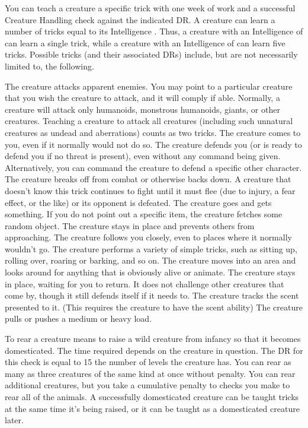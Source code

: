          You can teach a creature a specific trick with one week of work and a successful Creature Handling check against the indicated DR\@. A creature can learn a number of tricks equal to its Intelligence . Thus, a creature with an Intelligence of  can learn a single trick, while a creature with an Intelligence of  can learn five tricks. Possible tricks (and their associated DRs) include, but are not necessarily limited to, the following.

         The creature attacks apparent enemies. You may point to a particular creature that you wish the creature to attack, and it will comply if able. Normally, a creature will attack only humanoids, monstrous humanoids, giants, or other creatures. Teaching a creature to attack all creatures (including such unnatural creatures as undead and aberrations) counts as two tricks.
         The creature comes to you, even if it normally would not do so.
         The creature defends you (or is ready to defend you if no threat is present), even without any command being given. Alternatively, you can command the creature to defend a specific other character.
         The creature breaks off from combat or otherwise backs down. A creature that doesn't know this trick continues to fight until it must flee (due to injury, a fear effect, or the like) or its opponent is defeated.
         The creature goes and gets something. If you do not point out a specific item, the creature fetches some random object.
         The creature stays in place and prevents others from approaching.
         The creature follows you closely, even to places where it normally wouldn't go.
         The creature performs a variety of simple tricks, such as sitting up, rolling over, roaring or barking, and so on.
         The creature moves into an area and looks around for anything that is obviously alive or animate.
         The creature stays in place, waiting for you to return. It does not challenge other creatures that come by, though it still defends itself if it needs to.
         The creature tracks the scent presented to it. (This requires the creature to have the scent ability)
         The creature pulls or pushes a medium or heavy load.

         To rear a creature means to raise a wild creature from infancy so that it becomes domesticated. The time required depends on the creature in question. The DR for this check is equal to 15 \add the number of levels the creature has. You can rear as many as three creatures of the same kind at once without penalty. You can rear additional creatures, but you take a cumulative  penalty to checks you make to rear all of the animals. A successfully domesticated creature can be taught tricks at the same time it's being raised, or it can be taught as a domesticated creature later.

